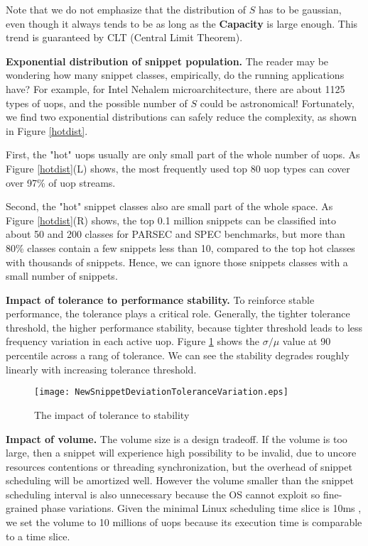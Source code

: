 Note that we do not emphasize that the distribution of $S$ has to be gaussian, even though it always tends to be as long as the \textbf{Capacity} is large enough. This trend is guaranteed by CLT (Central Limit Theorem).

\textbf{Exponential distribution of snippet population.} The reader may be wondering how many snippet classes, empirically, do the running applications have?   For example, for Intel Nehalem microarchitecture, there  are about 1125 types of uops, and the possible number of $S$ could be astronomical!   Fortunately, we find two exponential distributions can safely reduce the complexity, as shown in Figure \ref{hotdist}.

First, the "hot" uops usually are only small part of the whole number of uops. As Figure \ref{hotdist}(L) shows, the most frequently used top 80 uop types can cover over 97\% of uop streams.

Second, the "hot" snippet classes also are small part of the whole space. As Figure \ref{hotdist}(R) shows, the top 0.1 million snippets can be classified into about 50 and 200 classes for PARSEC and SPEC benchmarks, but more than 80\% classes contain a few snippets less than 10, compared to the top hot classes with thousands of snippets.  Hence, we can ignore those snippets classes with a small number of snippets.

\textbf{Impact of tolerance to performance stability.} To reinforce stable performance,  the tolerance plays a critical role. Generally, the tighter tolerance threshold, the higher performance stability, because tighter threshold leads to less frequency variation in each active uop. Figure \ref{tolerance} shows the $\sigma/\mu$ value at 90 percentile across a rang of tolerance. We can see the stability degrades roughly linearly with increasing tolerance threshold.

\begin{figure}[t]
  \centering
  \texttt{[image: NewSnippetDeviationToleranceVariation.eps]}\\
  \caption{The impact of tolerance to stability}\label{tolerance}
\end{figure}


\textbf{Impact of volume.}
The volume size is a design tradeoff. If the volume is too large, then a snippet will experience high possibility to be invalid, due to uncore resources contentions or threading synchronization, but the overhead of snippet scheduling will be amortized well. However the volume smaller than the snippet scheduling interval is also unnecessary because the OS cannot exploit so fine-grained phase variations. Given the minimal Linux  scheduling time slice is 10ms \cite{PIE}, we set the volume to 10 millions of uops because its execution time is comparable to a time slice.


